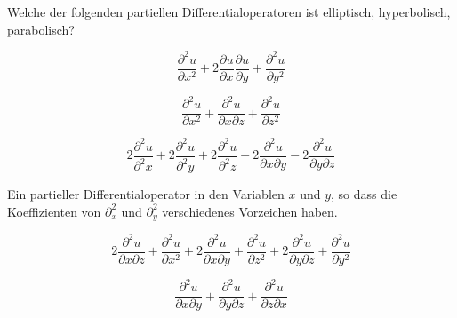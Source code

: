 Welche der folgenden partiellen Differentialoperatoren ist
elliptisch, hyperbolisch, parabolisch?
\begin{teilaufgaben}
\item \[
\frac{\partial^2 u}{\partial x^2}
+2\frac{\partial u}{\partial x}\frac{\partial u}{\partial y}
+\frac{\partial^2u}{\partial y^2}
\]
\item \[
\frac{\partial^2 u}{\partial x^2}
+\frac{\partial^2 u}{\partial x\partial z}
+\frac{\partial^2 u}{\partial z^2}
\]
\item \[
2\frac{\partial^2u}{\partial^2x}
+2\frac{\partial^2u}{\partial^2y}
+2\frac{\partial^2u}{\partial^2z}
-2\frac{\partial^2u}{\partial x\partial y}
-2\frac{\partial^2u}{\partial y\partial z}
\]
\item Ein partieller Differentialoperator in den Variablen $x$ und $y$,
so dass die Koeffizienten von $\partial_x^2$ und $\partial_y^2$
verschiedenes Vorzeichen haben.
\item \[
2\frac{\partial^2u}{\partial x\partial z}
+\frac{\partial^2u}{\partial x^2}
+2\frac{\partial^2u}{\partial x\partial y}
+\frac{\partial^2u}{\partial z^2}
+2\frac{\partial^2u}{\partial y\partial z}
+\frac{\partial^2u}{\partial y^2}
\]
\item
\[
\frac{\partial^2u}{\partial x\partial y}
+\frac{\partial^2u}{\partial y\partial z}
+\frac{\partial^2u}{\partial z\partial x}
\]
\end{teilaufgaben}

